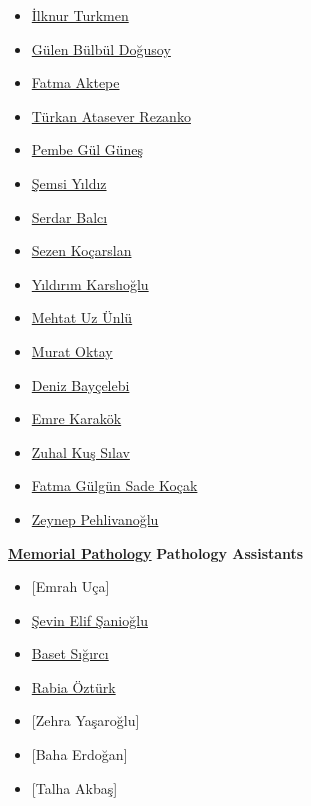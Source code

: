 \documentclass[
  letterpaper,
  paper=6in:9in,
  pagesize=pdftex,
  headinclude=on,
  footinclude=on,
  12pt]{scrbook}
\begin{document}
\begin{itemize}
\item
  \href{https://www.memorial.com.tr/en/doctors/ilknur-turkmen-1975}{İlknur
  Turkmen}
\item
  \href{https://www.memorial.com.tr/doktorlar/gulen-bulbul-dogusoy}{Gülen
  Bülbül Doğusoy}
\item
  \href{https://www.memorial.com.tr/doktorlar/fatma-aktepe}{Fatma
  Aktepe}
\item
  \href{https://www.memorial.com.tr/doktorlar/turkan-atasever-rezanko}{Türkan
  Atasever Rezanko}
\item
  \href{https://www.memorial.com.tr/doktorlar/pembe-gul-gunes}{Pembe Gül
  Güneş}
\item
  \href{https://www.memorial.com.tr/doktorlar/semsi-yildiz}{Şemsi
  Yıldız}
\item
  \href{https://www.memorial.com.tr/doktorlar/serdar-balci-k}{Serdar
  Balcı}
\item
  \href{https://www.memorial.com.tr/doktorlar/sezen-kocarslan}{Sezen
  Koçarslan}
\item
  \href{https://www.memorial.com.tr/doktorlar/yildirim-karslioglu}{Yıldırım
  Karslıoğlu}
\item
  \href{https://www.memorial.com.tr/doktorlar/mehtat-uz-unlu}{Mehtat Uz
  Ünlü}
\item
  \href{https://www.memorial.com.tr/doktorlar/murat-oktay}{Murat Oktay}
\item
  \href{https://www.memorial.com.tr/doktorlar/deniz-baycelebi}{Deniz
  Bayçelebi}
\item
  \href{https://www.memorial.com.tr/doktorlar/emre-karakok}{Emre
  Karakök}
\item
  \href{https://www.memorial.com.tr/doktorlar/zuhal-kus-silav}{Zuhal Kuş
  Sılav}
\item
  \href{https://www.memorial.com.tr/doktorlar/fatma-gulgun-sade-kocak}{Fatma
  Gülgün Sade Koçak}
\item
  \href{https://www.memorial.com.tr/doktorlar/zeynep-pehlivanoglu}{Zeynep
  Pehlivanoğlu}
\end{itemize}

\href{https://patoloji.memorial.com.tr/}{\textbf{Memorial Pathology}}
\textbf{Pathology Assistants}

\begin{itemize}
\item
  {[}Emrah Uça{]}
\item
  \href{https://www.linkedin.com/in/\%C5\%9Fevin-elif-\%C5\%9Fanio\%C4\%9Flu-99449a1b0/}{Şevin
  Elif Şanioğlu}
\item
  \href{https://www.linkedin.com/in/baset-s\%C4\%B1\%C4\%9F\%C4\%B1rc\%C4\%B1-aa2406141/}{Baset
  Sığırcı}
\item
  \href{https://www.linkedin.com/in/rabia-\%C3\%B6zt\%C3\%BCrk-4989b3151/}{Rabia
  Öztürk}
\item
  {[}Zehra Yaşaroğlu{]}
\item
  {[}Baha Erdoğan{]}
\item
  {[}Talha Akbaş{]}
\end{itemize}
\end{document}
